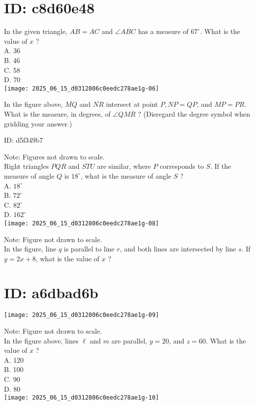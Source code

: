 \section*{ID: c8d60e48}
In the given triangle, $A B=A C$ and $\angle A B C$ has a measure of $67^{\circ}$. What is the value of $x$ ?\\
A. 36\\
B. 46\\
C. 58\\
D. 70\\
\texttt{[image: 2025\_06\_15\_d0312806c0eedc278ae1g-06]}

In the figure above, $\overline{M Q}$ and $\overline{N R}$ intersect at point $P, N P=Q P$, and $M P=P R$. What is the measure, in degrees, of $\angle Q M R$ ? (Disregard the degree symbol when gridding your answer.)

ID: d5f349b7

Note: Figures not drawn to scale.\\
Right triangles $P Q R$ and $S T U$ are similar, where $P$ corresponds to $S$. If the measure of angle $Q$ is $18^{\circ}$, what is the measure of angle $S$ ?\\
A. $18^{\circ}$\\
B. $72^{\circ}$\\
C. $82^{\circ}$\\
D. $162^{\circ}$\\
\texttt{[image: 2025\_06\_15\_d0312806c0eedc278ae1g-08]}

Note: Figure not drawn to scale.\\
In the figure, line $q$ is parallel to line $r$, and both lines are intersected by line $s$. If $y=2 x+8$, what is the value of $x$ ?

\section*{ID: a6dbad6b}
\begin{center}
\texttt{[image: 2025\_06\_15\_d0312806c0eedc278ae1g-09]}
\end{center}

Note: Figure not drawn to scale.\\
In the figure above, lines $\ell$ and $m$ are parallel, $y=20$, and $z=60$. What is the value of $x$ ?\\
A. 120\\
B. 100\\
C. 90\\
D. 80\\
\texttt{[image: 2025\_06\_15\_d0312806c0eedc278ae1g-10]}


